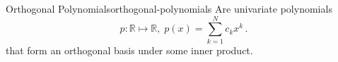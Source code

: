 \begin{definition}{Orthogonal Polynomials}{orthogonal-polynomials}
  Are univariate polynomials
  \[p: \mathbb{R} \mapsto \mathbb{R}, \; p(x) = \sum_{k=1}^N c_k x^k\,.\]
  that form an orthogonal basis under some inner product.
\end{definition}
